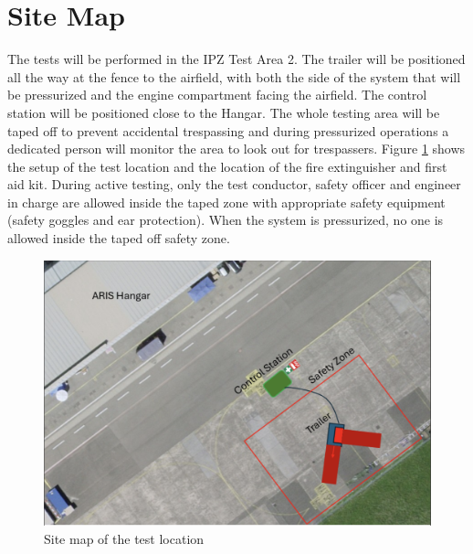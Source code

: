 \documentclass{article}
\begin{document}
\section{Site Map}
The tests will be performed in the IPZ Test Area 2. The trailer will be positioned all the way at the fence to the airfield, with both the side of the system that will be pressurized and the engine compartment facing the airfield. The control station will be positioned close to the Hangar. The whole testing area will be taped off to prevent accidental trespassing and during pressurized operations a dedicated person will monitor the area to look out for trespassers.
Figure \ref{fig:location-plan} shows the setup of the test location and the location of the fire extinguisher and first aid kit. During active testing, only the test conductor, safety officer and engineer in charge are allowed inside the taped zone with appropriate safety equipment (safety goggles and ear protection). When the system is pressurized, no one is allowed inside the taped off safety zone.
\begin{figure}[h]
    \centering
    \includegraphics[width=\textwidth]{assets/location-map.png}
    \caption{Site map of the test location}
    \label{fig:location-plan}
\end{figure}

\newpage

\newpage
\end{document}
